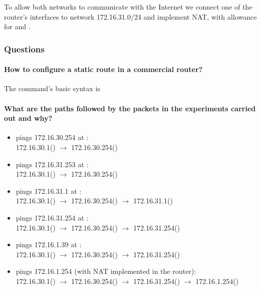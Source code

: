 \documentclass[compilation.tex]{subfiles}
\begin{document}
To allow both networks to communicate with the Internet we connect one of the router's interfaces to network 172.16.31.0/24 and implement NAT, with allowance for  and .

\subsubsection{Questions}
\label{subsubsec:exp4questions}

\paragraph{How to configure a static route in a commercial router?}
The command's basic syntax is
\begin{center}
\end{center}

\paragraph{What are the paths followed by the packets in the experiments carried out and why?}
\begin{itemize}[noitemsep,leftmargin=*,topsep=0pt]
	\item {} pings 172.16.30.254 at :\\
	172.16.30.1() $\rightarrow$ 172.16.30.254()
	\item {} pings 172.16.31.253 at :\\
	   172.16.30.1() $\rightarrow$ 172.16.30.254()
	\item {} pings 172.16.31.1 at :\\
	   172.16.30.1() $\rightarrow$ 172.16.30.254() $\rightarrow$ 172.16.31.1()
	\item {} pings 172.16.31.254 at :\\
	   172.16.30.1() $\rightarrow$ 172.16.30.254() $\rightarrow$ 172.16.31.254()
	\item {} pings 172.16.1.39 at :\\
	   172.16.30.1() $\rightarrow$ 172.16.30.254() $\rightarrow$ 172.16.31.254()
	\item {} pings 172.16.1.254 (with NAT implemented in the router):\\
	   172.16.30.1() $\rightarrow$ 172.16.30.254() $\rightarrow$ 172.16.31.254() $\rightarrow$ 172.16.1.254()
\end{itemize}
\end{document}
